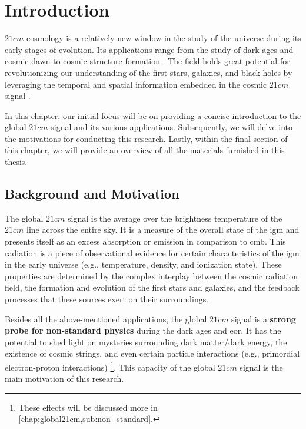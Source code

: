 \documentclass[12pt, TexShade, letterpaper]{report}
\begin{document}
 	\clearpage
	
	\glsresetall
\chapter{Introduction}
\label{chap:intro}
$21cm$ cosmology is a relatively new window in the study of the universe during its early stages of evolution. Its applications range from the study of dark ages and cosmic dawn to cosmic structure formation \cite{SKA_dark_ages}. The field holds great potential for revolutionizing our understanding of the first stars, galaxies, and black holes by leveraging the temporal and spatial information embedded in the cosmic $21cm$ signal \cite{21cmfast_c}.\par

In this chapter, our initial focus will be on providing a concise introduction to the global $21cm$ signal and its various applications. Subsequently, we will delve into the motivations for conducting this research. Lastly, within the final section of this chapter, we will provide an overview of all the materials furnished in this thesis.\par
\section{Background and Motivation}
The global $21cm$ signal is the average over the brightness temperature of the $21cm$ line across the entire sky. It is a measure of the overall state of the \gls{igm} and presents itself as an excess absorption or emission in comparison to \gls{cmb}. This radiation is a piece of observational evidence for certain characteristics of the \gls{igm} in the early universe (e.g., temperature, density, and ionization state). These properties are determined by the complex interplay between the cosmic radiation field, the formation and evolution of the first stars and galaxies, and the feedback processes that these sources exert on their surroundings\cite{21century}.\par
Besides all the above-mentioned applications, the global $21cm$ signal is a \textbf{strong probe for non-standard physics} during the dark ages and \gls{eor}. It has the potential to shed light on mysteries surrounding dark matter/dark energy, the existence of cosmic strings, and even certain particle interactions (e.g., primordial electron-proton interactions) \cite{dark_nature_21, constrain_dm_21, cosmic_string_brandenberger, ee_interaction_21, neutrino_21} \footnote{These effects will be discussed more in \ref{chap:global21cm,sub:non_standard}.}. This capacity of the global $21cm$ signal is the main motivation of this research.\par
\end{document}
